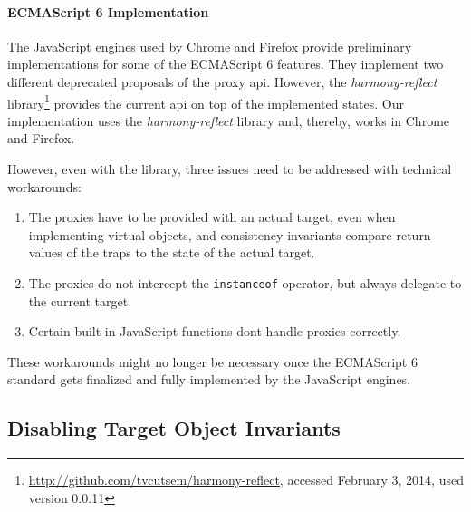 \paragraph{ECMAScript 6 Implementation}
The JavaScript engines used by Chrome and Firefox provide preliminary implementations for some of the ECMAScript 6 features.
They implement two different deprecated proposals of the proxy \ac{api}.
However, the \emph{harmony-reflect} library\footnote{\url{http://github.com/tvcutsem/harmony-reflect}, accessed February 3, 2014, used version 0.0.11} provides the current \ac{api} on top of the implemented states.
Our implementation uses the \emph{harmony-reflect} library and, thereby, works in Chrome and Firefox.

However, even with the library, three issues need to be addressed with technical workarounds:

\begin{enumerate}
    \item The proxies have to be provided with an actual target, even when implementing virtual objects, and consistency invariants compare return values of the traps to the state of the actual target. 
    \item The proxies do not intercept the \lstinline{instanceof} operator, but always delegate to the current target.
    \item Certain built-in JavaScript functions dont handle proxies correctly.
\end{enumerate}

These workarounds might no longer be necessary once the ECMAScript 6 standard gets finalized and fully implemented by the JavaScript engines. 


\subsection{Disabling Target Object Invariants}

